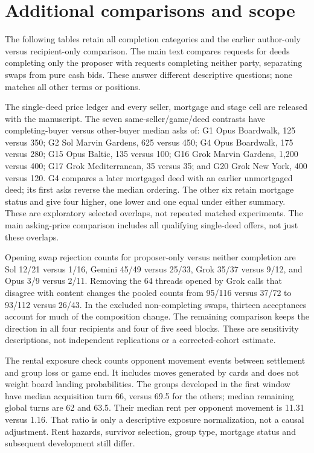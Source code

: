\section{Additional comparisons and scope}
\label{app:comparisons}
The following tables retain all completion categories and the earlier author-only versus recipient-only comparison. The main text compares requests for deeds completing only the proposer with requests completing neither party, separating swaps from pure cash bids. These answer different descriptive questions; none matches all other terms or positions.



The single-deed price ledger and every seller, mortgage and stage cell are released with the manuscript. The seven same-seller/game/deed contrasts have completing-buyer versus other-buyer median asks of: G1 Opus Boardwalk, 125 versus 350; G2 Sol Marvin Gardens, 625 versus 450; G4 Opus Boardwalk, 175 versus 280; G15 Opus Baltic, 135 versus 100; G16 Grok Marvin Gardens, 1,200 versus 400; G17 Grok Mediterranean, 35 versus 35; and G20 Grok New York, 400 versus 120. G4 compares a later mortgaged deed with an earlier unmortgaged deed; its first asks reverse the median ordering. The other six retain mortgage status and give four higher, one lower and one equal under either summary. These are exploratory selected overlaps, not repeated matched experiments. The main asking-price comparison includes all qualifying single-deed offers, not just these overlaps.

Opening swap rejection counts for proposer-only versus neither completion are Sol 12/21 versus 1/16, Gemini 45/49 versus 25/33, Grok 35/37 versus 9/12, and Opus 3/9 versus 2/11. Removing the 64 threads opened by Grok calls that disagree with content changes the pooled counts from 95/116 versus 37/72 to 93/112 versus 26/43. In the excluded non-completing swaps, thirteen acceptances account for much of the composition change. The remaining comparison keeps the direction in all four recipients and four of five seed blocks. These are sensitivity descriptions, not independent replications or a corrected-cohort estimate.

The rental exposure check counts opponent movement events between settlement and group loss or game end. It includes moves generated by cards and does not weight board landing probabilities. The groups developed in the first window have median acquisition turn 66, versus 69.5 for the others; median remaining global turns are 62 and 63.5. Their median rent per opponent movement is 11.31 versus 1.16. That ratio is only a descriptive exposure normalization, not a causal adjustment. Rent hazards, survivor selection, group type, mortgage status and subsequent development still differ.

